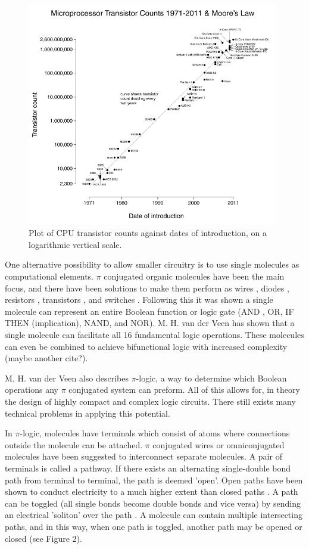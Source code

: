 \documentclass[12pt]{article}
\begin{document}
\begin{figure}[ht!]
\centering
\includegraphics[width=110mm]{MooresLaw.png}
\caption{Plot of CPU transistor counts against dates of introduction, on a logarithmic vertical scale.}
\end{figure}

One alternative possibility to allow smaller circuitry is to use single molecules as computational elements. $\pi$ conjugated organic molecules have been the main focus, and there have been solutions to make them perform as wires \cite{9}, diodes \cite{10,11}, resistors \cite{12,13}, transistors \cite{14, 15, 16, 17}, and switches \cite{18, 19}. Following this it was shown a single molecule can represent an entire Boolean function or logic gate (AND\cite{20} , OR\cite{21}, IF THEN (implication)\cite{22}, NAND\cite{23}, and NOR\cite{24}). M. H.  van der Veen \cite{v06} has shown that a single molecule can facilitate all 16 fundamental logic operations. These molecules can even be combined to achieve bifunctional logic with increased complexity (maybe another cite?).

M. H. van der Veen \cite{v06} also describes $\pi$-logic, a way to determine which Boolean operations any $\pi$ conjugated system can preform. All of this allows for, in theory the design of highly compact and complex logic circuits. There still exists many technical problems in applying this potential.

In $\pi$-logic, molecules have terminals which consist of atoms where connections outside the molecule can be attached. $\pi$ conjugated wires \cite{9} or omniconjugated molecules \cite{OmniConj} have been suggested to interconnect separate molecules. A pair of terminals is called a pathway. If there exists an alternating single-double bond path from terminal to terminal, the path is deemed 'open'. Open paths have been shown to conduct electricity to a much higher extent than closed paths \cite{openPath}. A path can be toggled (all single bonds become double bonds and vice versa) by sending an electrical 'soliton' over the path \cite{HK88}. A molecule can contain multiple intersecting paths, and in this way, when one path is toggled, another path may be opened or closed (see Figure 2).
\end{document}
